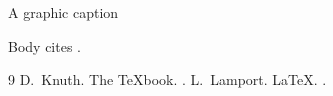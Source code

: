 \documentclass{achemso}
\begin{document}
\begin{tocentry}A graphic caption\end{tocentry}
Body cites \cite{knuth,lamport}.
\begin{thebibliography}{9}
 D.~Knuth. \newblock The TeXbook. .
 L.~Lamport. \newblock LaTeX. .
\end{thebibliography}
\end{document}
